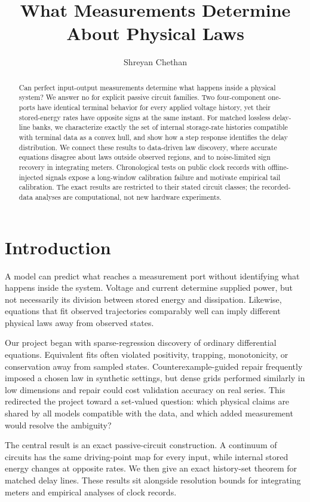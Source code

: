 \documentclass[11pt]{amsart}
\title[Measurements and physical laws]{What Measurements Determine About Physical Laws}
\author{Shreyan Chethan}
\date{}
\theoremstyle{remark}\newtheorem{remark}[theorem]{Remark}
\begin{document}
\begin{abstract}
Can perfect input-output measurements determine what happens inside a physical system? We answer no for explicit passive circuit families. Two four-component one-ports have identical terminal behavior for every applied voltage history, yet their stored-energy rates have opposite signs at the same instant. For matched lossless delay-line banks, we characterize exactly the set of internal storage-rate histories compatible with terminal data as a convex hull, and show how a step response identifies the delay distribution. We connect these results to data-driven law discovery, where accurate equations disagree about laws outside observed regions, and to noise-limited sign recovery in integrating meters. Chronological tests on public clock records with offline-injected signals expose a long-window calibration failure and motivate empirical tail calibration. The exact results are restricted to their stated circuit classes; the recorded-data analyses are computational, not new hardware experiments.
\end{abstract}
\maketitle

\section{Introduction}
A model can predict what reaches a measurement port without identifying what happens inside the system. Voltage and current determine supplied power, but not necessarily its division between stored energy and dissipation. Likewise, equations that fit observed trajectories comparably well can imply different physical laws away from observed states.

Our project began with sparse-regression discovery of ordinary differential equations. Equivalent fits often violated positivity, trapping, monotonicity, or conservation away from sampled states. Counterexample-guided repair frequently imposed a chosen law in synthetic settings, but dense grids performed similarly in low dimensions and repair could cost validation accuracy on real series. This redirected the project toward a set-valued question: which physical claims are shared by all models compatible with the data, and which added measurement would resolve the ambiguity?

The central result is an exact passive-circuit construction. A continuum of circuits has the same driving-point map for every input, while internal stored energy changes at opposite rates. We then give an exact history-set theorem for matched delay lines. These results sit alongside resolution bounds for integrating meters and empirical analyses of clock records.
\end{document}
